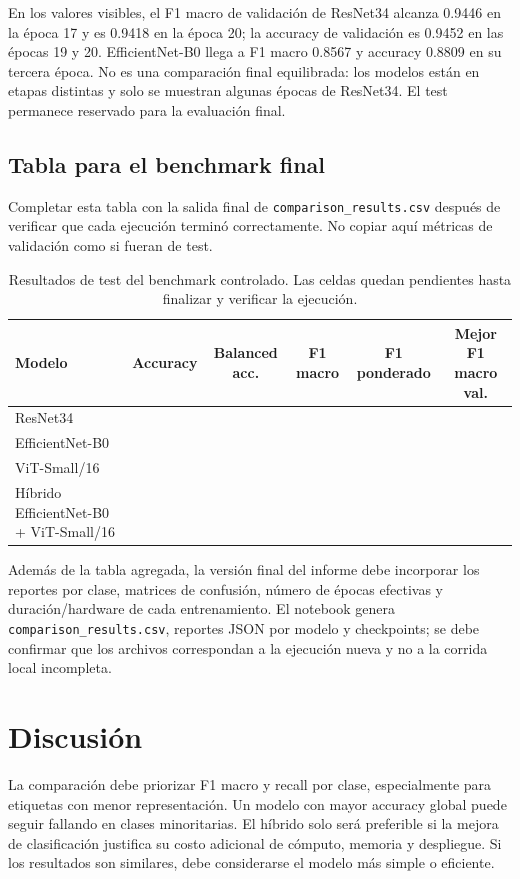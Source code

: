 \documentclass[11pt,a4paper]{article}
\newcommand{\metricapendiente}{\textemdash}
\begin{document}
En los valores visibles, el F1 macro de validación de ResNet34 alcanza 0.9446 en la época 17 y es 0.9418 en la época 20; la accuracy de validación es 0.9452 en las épocas 19 y 20. EfficientNet-B0 llega a F1 macro 0.8567 y accuracy 0.8809 en su tercera época. No es una comparación final equilibrada: los modelos están en etapas distintas y solo se muestran algunas épocas de ResNet34. El test permanece reservado para la evaluación final.

\subsection{Tabla para el benchmark final}
Completar esta tabla con la salida final de \texttt{comparison\_results.csv} después de verificar que cada ejecución terminó correctamente. No copiar aquí métricas de validación como si fueran de test.

\begin{table}[ht]
\centering
\small
\caption{Resultados de test del benchmark controlado. Las celdas quedan pendientes hasta finalizar y verificar la ejecución.}
\begin{tabularx}{\textwidth}{Yccccc}
\toprule
Modelo & Accuracy & Balanced acc. & F1 macro & F1 ponderado & Mejor F1 macro val. \\
\midrule
ResNet34 & \metricapendiente & \metricapendiente & \metricapendiente & \metricapendiente & \metricapendiente \\
EfficientNet-B0 & \metricapendiente & \metricapendiente & \metricapendiente & \metricapendiente & \metricapendiente \\
ViT-Small/16 & \metricapendiente & \metricapendiente & \metricapendiente & \metricapendiente & \metricapendiente \\
Híbrido EfficientNet-B0 + ViT-Small/16 & \metricapendiente & \metricapendiente & \metricapendiente & \metricapendiente & \metricapendiente \\
\bottomrule
\end{tabularx}
\end{table}

Además de la tabla agregada, la versión final del informe debe incorporar los reportes por clase, matrices de confusión, número de épocas efectivas y duración/hardware de cada entrenamiento. El notebook genera \texttt{comparison\_results.csv}, reportes JSON por modelo y checkpoints; se debe confirmar que los archivos correspondan a la ejecución nueva y no a la corrida local incompleta.

\section{Discusión}
La comparación debe priorizar F1 macro y recall por clase, especialmente para etiquetas con menor representación. Un modelo con mayor accuracy global puede seguir fallando en clases minoritarias. El híbrido solo será preferible si la mejora de clasificación justifica su costo adicional de cómputo, memoria y despliegue. Si los resultados son similares, debe considerarse el modelo más simple o eficiente.
\end{document}

